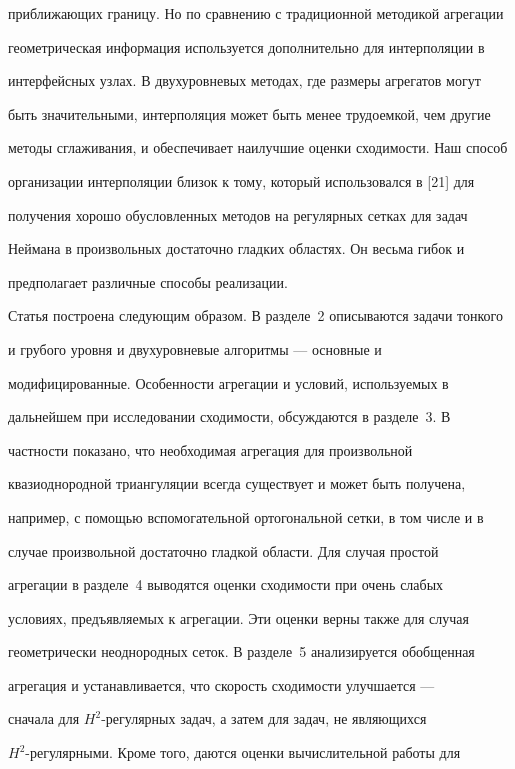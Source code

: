 приближающих границу. Но по сравнению с традиционной методикой агрегации


геометрическая информация используется дополнительно для интерполяции в


интерфейсных узлах. В двухуровневых методах, где размеры агрегатов могут


быть значительными, интерполяция может быть менее трудоемкой, чем другие


методы сглаживания, и обеспечивает наилучшие оценки сходимости. Наш способ


организации интерполяции близок к тому, который использовался в [21] для


получения хорошо обусловленных методов на регулярных сетках для задач


Неймана в произвольных достаточно гладких областях. Он весьма гибок и


предполагает различные способы реализации.





Статья построена следующим образом. В разделе~2 описываются задачи тонкого


и грубого уровня и двухуровневые алгоритмы --- основные и


модифицированные. Особенности агрегации и условий, используемых в


дальнейшем при исследовании сходимости, обсуждаются в разделе~3. В


частности показано, что необходимая агрегация для произвольной


квазиоднородной триангуляции всегда существует и может быть получена,


например, с помощью вспомогательной ортогональной сетки, в том числе и в


случае произвольной достаточно гладкой области. Для случая простой


агрегации в разделе~4 выводятся оценки сходимости при очень слабых


условиях, предъявляемых к агрегации. Эти оценки верны также для случая


геометрически неоднородных сеток. В разделе~5 анализируется обобщенная


агрегация и устанавливается, что скорость сходимости улучшается ---


сначала для $H^2$-регулярных задач, а затем для задач, не являющихся


$H^2$-регулярными. Кроме того, даются оценки вычислительной работы для



